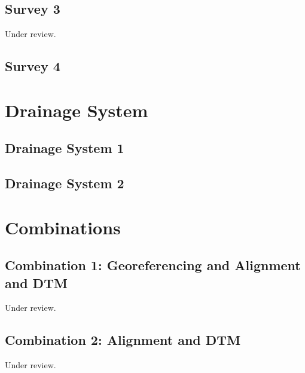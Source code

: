 \documentclass{scrartcl}
\begin{document}
\subsection{Survey 3} %
\label{sec:survey_3}
Under review.%
\clearpage

\subsection{Survey 4} %
\label{sec:survey_4}
\clearpage


\section{Drainage System}
\label{sec:drainage_system}

\subsection{Drainage System 1}
\label{sec:drainage_1}
\clearpage

\subsection{Drainage System 2}
\label{sec:drainage_2}
\clearpage

\section{Combinations}
\label{sec:combinations}

\subsection{Combination 1: Georeferencing and Alignment and DTM} %
\label{sec:align_dtm_1}
Under review.%
\clearpage

\subsection{Combination 2: Alignment and DTM} %
\label{sec:align_dtm_2}
Under review.%
\clearpage
\end{document}

